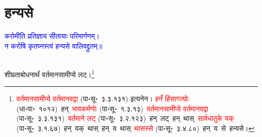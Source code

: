 \section[हन्यसे]{हन्यसे}
\centering\textcolor{blue}{करोमीति प्रतिज्ञाय सीतायाः परिमार्गणम्।\nopagebreak\\
न करोषि कृतघ्नस्त्वं हन्यसे वालिवद्द्रुतम्॥}\nopagebreak\\
\\
\fontsize{14}{21}\selectfont\begin{sloppypar}\justifying\noindent\hspace{10mm} शीघ्रता\-बोधनार्थं वर्तमान\-सामीप्ये लट्।\footnote{\textcolor{red}{वर्तमान\-सामीप्ये वर्तमानवद्वा} (पा॰सू॰~३.३.१३१) इत्यनेन। \textcolor{red}{हनँ हिंसागत्योः} (धा॰पा॰~१०१२)~\arrow हन्~\arrow \textcolor{red}{भावकर्मणोः} (पा॰सू॰~१.३.१३)~\arrow \textcolor{red}{वर्तमान\-सामीप्ये वर्तमानवद्वा} (पा॰सू॰~३.३.१३१)~\arrow \textcolor{red}{वर्तमाने लट्} (पा॰सू॰~३.२.१२३)~\arrow हन्~लट्~\arrow हन्~थास्~\arrow \textcolor{red}{सार्वधातुके यक्} (पा॰सू॰~३.१.६७)~\arrow हन्~यक्~थास्~\arrow हन्~य~थास्~\arrow \textcolor{red}{थासस्से} (पा॰सू॰~३.४.८०)~\arrow हन्~य~से~\arrow हन्यसे। }\end{sloppypar}
